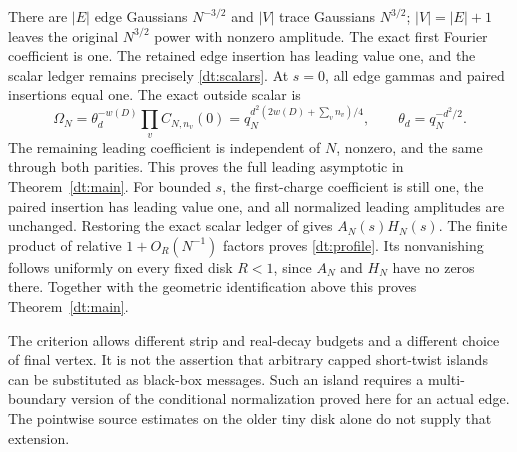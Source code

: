 There are \(|E|\) edge Gaussians \(N^{-3/2}\) and \(|V|\) trace Gaussians \(N^{3/2}\);
\(|V|=|E|+1\) leaves the original \(N^{3/2}\) power with nonzero amplitude.
The exact first Fourier coefficient is one. The retained edge insertion
has leading value one, and the scalar ledger remains precisely \eqref{dt:scalars}.
At \(s=0\), all edge gammas and paired insertions equal one.
The exact outside scalar is
\[
 \Omega_N=\theta_d^{-w(D)}\prod_vC_{N,n_v}(0)
       =q_N^{d^2(2w(D)+\sum_v n_v)/4},
 \qquad \theta_d=q_N^{-d^2/2}.
\]
The remaining leading coefficient is independent of \(N\), nonzero,
and the same through both parities. This proves the full leading
asymptotic in Theorem~\ref{dt:main}.
For bounded \(s\), the first-charge coefficient is still one, the
paired insertion has leading value one, and all normalized leading
amplitudes are unchanged. Restoring the exact scalar ledger of
\cite[Proposition~8.1]{Meridian} gives \(A_N(s)H_N(s)\).
The finite product of relative \(1+O_R(N^{-1})\) factors proves
\eqref{dt:profile}. Its nonvanishing follows uniformly on every
fixed disk \(R<1\), since \(A_N\) and \(H_N\) have no zeros there.
Together with the geometric identification above this proves
Theorem~\ref{dt:main}.

The criterion allows different strip and real-decay budgets and a
different choice of final vertex. It is not the assertion that arbitrary
capped short-twist islands can be substituted as black-box messages.
Such an island requires a multi-boundary version of the conditional
normalization proved here for an actual edge. The pointwise source
estimates on the older tiny disk alone do not supply that extension.
